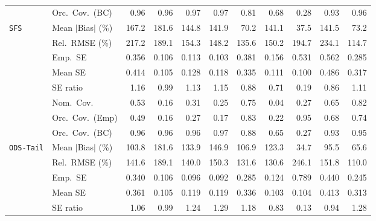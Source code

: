 \begin{landscape}
\begin{longtable}{llrrrrrrrrr}
 & Orc.\ Cov.\ (BC) & \cellcolor{rankone}0.96 & \cellcolor{rankone}0.96 & \cellcolor{ranktwo}0.97 & \cellcolor{ranktwo}0.97 & \cellcolor{rankthree}0.81 & 0.68 & 0.28 & \cellcolor{ranktwo}0.93 & \cellcolor{rankone}0.96 \\
\addlinespace[2pt]
\quad \texttt{SFS} & Mean $|$Bias$|$ (\%) & 167.2 & 181.6 & 144.8 & 141.9 & \cellcolor{ranktwo}70.2 & 141.1 & \cellcolor{rankone}37.5 & 141.5 & \cellcolor{rankthree}73.2 \\
 & Rel.\ RMSE (\%) & 217.2 & 189.1 & 154.3 & \cellcolor{rankthree}148.2 & \cellcolor{ranktwo}135.6 & 150.2 & 194.7 & 234.1 & \cellcolor{rankone}114.7 \\
 & Emp.\ SE & 0.356 & 0.106 & 0.113 & 0.103 & 0.381 & 0.156 & 0.531 & 0.562 & 0.285 \\
 & Mean SE & 0.414 & 0.105 & 0.128 & 0.118 & 0.335 & 0.111 & 0.100 & 0.486 & 0.317 \\
 & SE ratio & 1.16 & \cellcolor{rankone}0.99 & 1.13 & 1.15 & \cellcolor{rankthree}0.88 & 0.71 & 0.19 & 0.86 & \cellcolor{ranktwo}1.11 \\
 & Nom.\ Cov. & 0.53 & 0.16 & 0.31 & 0.25 & \cellcolor{ranktwo}0.75 & 0.04 & 0.27 & \cellcolor{rankthree}0.65 & \cellcolor{rankone}0.82 \\
 & Orc.\ Cov.\ (Emp) & 0.49 & 0.16 & 0.27 & 0.17 & \cellcolor{ranktwo}0.83 & 0.22 & \cellcolor{rankone}0.95 & 0.68 & \cellcolor{rankthree}0.74 \\
 & Orc.\ Cov.\ (BC) & \cellcolor{ranktwo}0.96 & \cellcolor{ranktwo}0.96 & \cellcolor{ranktwo}0.96 & \cellcolor{rankthree}0.97 & 0.88 & 0.65 & 0.27 & \cellcolor{rankthree}0.93 & \cellcolor{rankone}0.95 \\
\addlinespace[2pt]
\quad \texttt{ODS-Tail} & Mean $|$Bias$|$ (\%) & 103.8 & 181.6 & 133.9 & 146.9 & 106.9 & 123.3 & \cellcolor{rankone}34.7 & \cellcolor{rankthree}95.5 & \cellcolor{ranktwo}65.6 \\
 & Rel.\ RMSE (\%) & 141.6 & 189.1 & 140.0 & 150.3 & \cellcolor{rankthree}131.6 & \cellcolor{ranktwo}130.6 & 246.1 & 151.8 & \cellcolor{rankone}110.0 \\
 & Emp.\ SE & 0.340 & 0.106 & 0.096 & 0.092 & 0.285 & 0.124 & 0.789 & 0.440 & 0.245 \\
 & Mean SE & 0.361 & 0.105 & 0.119 & 0.119 & 0.336 & 0.103 & 0.104 & 0.413 & 0.313 \\
 & SE ratio & \cellcolor{ranktwo}1.06 & \cellcolor{rankone}0.99 & 1.24 & 1.29 & 1.18 & \cellcolor{rankthree}0.83 & 0.13 & \cellcolor{ranktwo}0.94 & 1.28 \\

\end{longtable}
\end{landscape}
